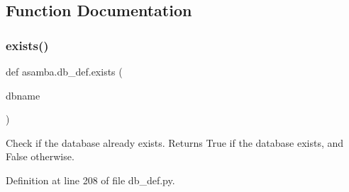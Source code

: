\subsection{Function Documentation}
\mbox{\label{namespaceasamba_1_1db__def_ae036f59b82c15b96d4d833e9f2fa5d95}} 
\subsubsection{\texorpdfstring{exists()}{exists()}}
{\footnotesize\ttfamily def asamba.\+db\+\_\+def.\+exists (\begin{DoxyParamCaption}\item[{}]{dbname }\end{DoxyParamCaption})}

\begin{DoxyVerb}Check if the database already exists.
Returns True if the database exists, and False otherwise.
\end{DoxyVerb}
 

Definition at line 208 of file db\+\_\+def.\+py.

